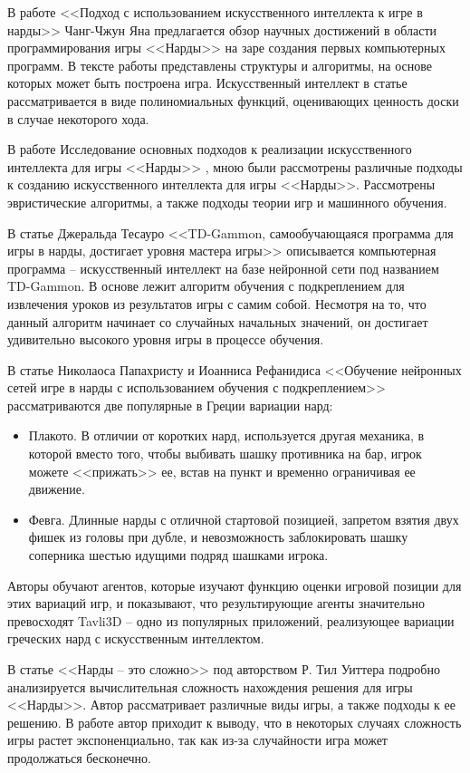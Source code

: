 В работе <<Подход с использованием искусственного интеллекта к игре в нарды>> Чанг-Чжун Яна \cite{firstattempts} предлагается обзор научных достижений в области программирования игры <<Нарды>> на заре создания первых компьютерных программ. В тексте работы представлены структуры и алгоритмы, на основе которых может быть построена игра. Искусственный интеллект в статье рассматривается в виде полиномиальных функций, оценивающих ценность доски в случае некоторого хода.

В работе Исследование основных подходов к реализации искусственного интеллекта для игры <<Нарды>> \cite{myfirstwork}, мною были рассмотрены различные подходы к созданию искусственного интеллекта для игры <<Нарды>>. Рассмотрены эвристические алгоритмы, а также подходы теории игр и машинного обучения.

В статье Джеральда Тесауро <<TD-Gammon, самообучающаяся программа для игры в нарды, достигает уровня мастера игры>> \cite{annotationtdgammon} описывается компьютерная программа -- искусственный интеллект на базе нейронной сети под названием TD-Gammon. В основе лежит алгоритм обучения с подкреплением для извлечения уроков из результатов игры с самим собой. Несмотря на то, что данный алгоритм начинает со случайных начальных значений, он достигает удивительно высокого уровня игры в процессе обучения.

В статье Николаоса Папахристу и Иоанниса Рефанидиса <<Обучение нейронных сетей игре в нарды с использованием обучения с подкреплением>> \cite{annotationavli3d} рассматриваются две популярные в Греции вариации нард:
\begin{itemize}
    \item Плакото. В отличии от коротких нард, используется другая механика, в которой вместо того, чтобы выбивать шашку противника на бар, игрок можете <<прижать>> ее, встав на пункт и временно ограничивая ее движение.
    \item Февга. Длинные нарды с отличной стартовой позицией, запретом взятия двух фишек из головы при дубле, и невозможность заблокировать шашку соперника шестью идущими подряд шашками игрока.
\end{itemize}

Авторы обучают агентов, которые изучают функцию оценки игровой позиции для этих вариаций игр, и показывают, что результирующие агенты значительно превосходят Tavli3D -- одно из популярных приложений, реализующее вариации греческих нард с искусственным интеллектом.

В статье <<Нарды -- это сложно>> под авторством Р. Тил Уиттера \cite{backgammonishard} подробно анализируется вычислительная сложность нахождения решения для игры <<Нарды>>. Автор рассматривает различные виды игры, а также подходы к ее решению. В работе автор приходит к выводу, что в некоторых случаях сложность игры растет экспоненциально, так как из-за случайности игра может продолжаться бесконечно.
